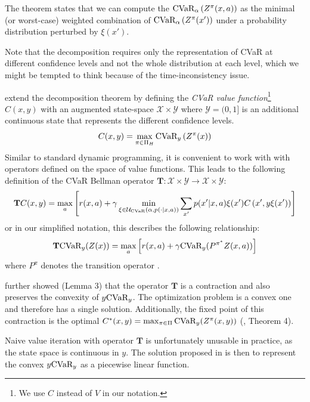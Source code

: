 The theorem states that we can compute the $\text{CVaR}_\alpha\left( {Z^\pi(x, a)} \right)$ as the minimal (or worst-case) weighted combination of $\text{CVaR}_\alpha\left( {Z^\pi(x')} \right)$ under a probability distribution perturbed by $\xi(x')$.

Note that the decomposition requires only the representation of CVaR at different confidence levels and not the whole distribution at each level, which we might be tempted to think because of the time-inconsistency issue.

\citet{chow2015risk} extend the decomposition theorem by defining the \emph{CVaR value function}\footnote{We use $C$ instead of $V$ in our notation.} $C(x, y)$ with an augmented state-space $\mathcal{X}\times\mathcal{Y}$ where $\mathcal{Y}=(0,1]$ is an additional continuous state that represents the different confidence levels.
%
\begin{equation}\label{eqn:cdef}
C(x, y)=\max_{\pi \in \Pi_H} \text{CVaR}_{y}\left( {Z^\pi(x)} \right)
\end{equation}
%
Similar to standard dynamic programming, it is convenient to work with with operators defined on the space of value functions. This leads to the following definition of the CVaR Bellman operator $\mathbf{T}:\mathcal{X}\times\mathcal{Y}\to\mathcal{X}\times\mathcal{Y}$:
%
\begin{equation}
\mathbf{T}C(x, y) = \max_a \left[ { r(x, a) + \gamma \min_{\xi \in \mathcal{U}_{\text{CVaR}}(\alpha, p(\cdot | x, a))} \sum_{x'} p(x'| x, a)\xi(x') C\left(x', y\xi(x')\right)} \right]
\end{equation}
%
or in our simplified notation, this describes the following relationship:
%
\begin{equation}\label{eqn:tcvar}
\mathbf{T} \text{CVaR}_y(Z(x))=\max_a \left[ {r(x, a) + \gamma \text{CVaR}_{y}(P^{\pi^*} Z(x, a))} \right]
\end{equation}
where $P^\pi$ denotes the transition operator .

\citet{chow2015risk} further showed (Lemma 3) that the operator $\mathbf{T}$ is a contraction and also preserves the convexity of $y\text{CVaR}_y$. The optimization problem  is a convex one and therefore has a single solution. Additionally, the fixed point of this contraction is the optimal $C^*(x, y) = \max_{\pi \in \Pi} \text{CVaR}_y (Z^\pi(x, y))$ (\citep{chow2015risk}, Theorem 4).
 
Naive value iteration with operator $\mathbf{T}$ is unfortunately unusable in practice, as the state space is continuous in $y$. The solution proposed in \cite{chow2015risk} is then to represent the convex $y\text{CVaR}_y$ as a piecewise linear function. 

